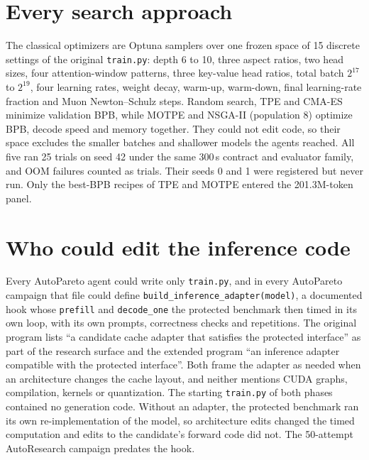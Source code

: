 \documentclass{article}
\begin{document}
\section{Every search approach}\label{app:approaches}
\begin{table}[H]
\caption{Every search approach and what became of its recipes. Attempts: scheduled (completed and trained). Best val BPB: the lowest validation BPB of one archived 300\,s discovery run, per seed for AutoPareto (0 / 1 / 42) and for AutoResearch's 50-attempt campaign / 5-attempt follow-up. These are single noisy runs (pooled seed SD \CRPooledSD), comparable only within one seed and phase: the starting model's score differs by \CRBaseSeedEffect{} BPB between seeds 0 and 42, and the extended harness is another setting. Verified: retrained at 201.3M matched tokens on new seeds (Table~\ref{tab:main}), in E1, or re-measured on a fresh A40.}\label{tab:approaches}
\centering\scriptsize\setlength{\tabcolsep}{3pt}
\end{table}
The classical optimizers are Optuna samplers over one frozen space of 15 discrete settings of the original \texttt{train.py}: depth 6 to 10, three aspect ratios, two head sizes, four attention-window patterns, three key-value head ratios, total batch $2^{17}$ to $2^{19}$, four learning rates, weight decay, warm-up, warm-down, final learning-rate fraction and Muon Newton--Schulz steps. Random search, TPE and CMA-ES minimize validation BPB, while MOTPE and NSGA-II (population 8) optimize BPB, decode speed and memory together. They could not edit code, so their space excludes the smaller batches and shallower models the agents reached. All five ran 25 trials on seed 42 under the same 300\,s contract and evaluator family, and OOM failures counted as trials. Their seeds 0 and 1 were registered but never run. Only the best-BPB recipes of TPE and MOTPE entered the 201.3M-token panel.

\section{Who could edit the inference code}\label{app:access}
Every AutoPareto agent could write only \texttt{train.py}, and in every AutoPareto campaign that file could define \texttt{build\_inference\_adapter(model)}, a documented hook whose \texttt{prefill} and \texttt{decode\_one} the protected benchmark then timed in its own loop, with its own prompts, correctness checks and repetitions. The original program lists ``a candidate cache adapter that satisfies the protected interface'' as part of the research surface and the extended program ``an inference adapter compatible with the protected interface''. Both frame the adapter as needed when an architecture changes the cache layout, and neither mentions CUDA graphs, compilation, kernels or quantization. The starting \texttt{train.py} of both phases contained no generation code. Without an adapter, the protected benchmark ran its own re-implementation of the model, so architecture edits changed the timed computation and edits to the candidate's forward code did not. The 50-attempt AutoResearch campaign predates the hook.
\end{document}
